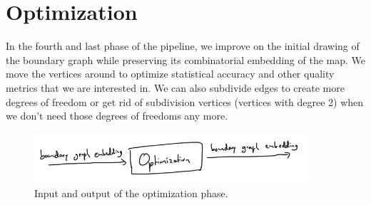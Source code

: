 \section{Optimization}
\label{sect:optimization}

In the fourth and last phase of the pipeline, we improve on the initial drawing of the boundary graph while preserving its combinatorial embedding of the map. We move the vertices around to optimize statistical accuracy and other quality metrics that we are interested in. We can also subdivide edges to create more degrees of freedom or get rid of subdivision vertices (vertices with degree 2) when we don't need those degrees of freedoms any more.

\begin{figure}[H]
	\centering\includegraphics[width=0.9\textwidth]{Resources/Pipeline-Optimization.png}
	\caption{Input and output of the optimization phase.}
	\label{fig:pipeline-optimization}
\end{figure}
